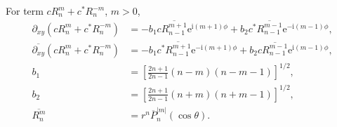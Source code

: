\documentclass[a4paper,12pt]{article}
\newcommand{\E}{\mathrm{e}}
\newcommand{\J}{\mathrm{i}}
\begin{document}
For term $cR_{n}^{m}+c^{*}R_{n}^{-m}$, $m>0$,
\begin{align}
  \partial_{xy} \left(cR_{n}^{m} + c^{*}R_{n}^{-m}\right)
  &=
    -b_{1}c
    \overline{R_{n-1}^{m+1}}\E^{\J(m+1)\phi}
    +b_{2}c^{*}
    \overline{R_{n-1}^{m-1}}\E^{-\J(m-1)\phi},\\
  \overline{\partial_{xy}} \left(cR_{n}^{m} + c^{*}R_{n}^{-m}\right)
  &=
    -b_{1}c^{*} \overline{R_{n-1}^{m+1}}\E^{-\J(m+1)\phi}
    +b_{2}c \overline{R_{n-1}^{m-1}}\E^{\J(m-1)\phi},\\
  b_{1} &=
          \left[
          \frac{2n+1}{2n-1}(n-m)(n-m-1)
          \right]^{1/2},\\
  b_{2} &=
          \left[
          \frac{2n+1}{2n-1}(n+m)(n+m-1)
          \right]^{1/2},\\
  \overline{R_{n}^{m}}
  &=
    r^{n}\overline{P}_{n}^{|m|}(\cos\theta).
\end{align}
\end{document}

